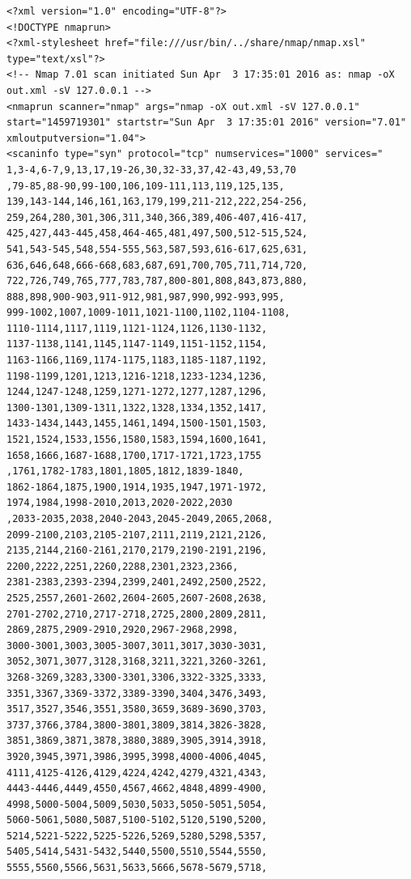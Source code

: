 \documentclass[12pt,a4paper]{report}
\begin{document}
\begin{lstlisting}[breaklines]
<?xml version="1.0" encoding="UTF-8"?>
<!DOCTYPE nmaprun>
<?xml-stylesheet href="file:///usr/bin/../share/nmap/nmap.xsl" type="text/xsl"?>
<!-- Nmap 7.01 scan initiated Sun Apr  3 17:35:01 2016 as: nmap -oX out.xml -sV 127.0.0.1 -->
<nmaprun scanner="nmap" args="nmap -oX out.xml -sV 127.0.0.1" start="1459719301" startstr="Sun Apr  3 17:35:01 2016" version="7.01" xmloutputversion="1.04">
<scaninfo type="syn" protocol="tcp" numservices="1000" services="
1,3-4,6-7,9,13,17,19-26,30,32-33,37,42-43,49,53,70
,79-85,88-90,99-100,106,109-111,113,119,125,135,
139,143-144,146,161,163,179,199,211-212,222,254-256,
259,264,280,301,306,311,340,366,389,406-407,416-417,
425,427,443-445,458,464-465,481,497,500,512-515,524,
541,543-545,548,554-555,563,587,593,616-617,625,631,
636,646,648,666-668,683,687,691,700,705,711,714,720,
722,726,749,765,777,783,787,800-801,808,843,873,880,
888,898,900-903,911-912,981,987,990,992-993,995,
999-1002,1007,1009-1011,1021-1100,1102,1104-1108,
1110-1114,1117,1119,1121-1124,1126,1130-1132,
1137-1138,1141,1145,1147-1149,1151-1152,1154,
1163-1166,1169,1174-1175,1183,1185-1187,1192,
1198-1199,1201,1213,1216-1218,1233-1234,1236,
1244,1247-1248,1259,1271-1272,1277,1287,1296,
1300-1301,1309-1311,1322,1328,1334,1352,1417,
1433-1434,1443,1455,1461,1494,1500-1501,1503,
1521,1524,1533,1556,1580,1583,1594,1600,1641,
1658,1666,1687-1688,1700,1717-1721,1723,1755
,1761,1782-1783,1801,1805,1812,1839-1840,
1862-1864,1875,1900,1914,1935,1947,1971-1972,
1974,1984,1998-2010,2013,2020-2022,2030
,2033-2035,2038,2040-2043,2045-2049,2065,2068,
2099-2100,2103,2105-2107,2111,2119,2121,2126,
2135,2144,2160-2161,2170,2179,2190-2191,2196,
2200,2222,2251,2260,2288,2301,2323,2366,
2381-2383,2393-2394,2399,2401,2492,2500,2522,
2525,2557,2601-2602,2604-2605,2607-2608,2638,
2701-2702,2710,2717-2718,2725,2800,2809,2811,
2869,2875,2909-2910,2920,2967-2968,2998,
3000-3001,3003,3005-3007,3011,3017,3030-3031,
3052,3071,3077,3128,3168,3211,3221,3260-3261,
3268-3269,3283,3300-3301,3306,3322-3325,3333,
3351,3367,3369-3372,3389-3390,3404,3476,3493,
3517,3527,3546,3551,3580,3659,3689-3690,3703,
3737,3766,3784,3800-3801,3809,3814,3826-3828,
3851,3869,3871,3878,3880,3889,3905,3914,3918,
3920,3945,3971,3986,3995,3998,4000-4006,4045,
4111,4125-4126,4129,4224,4242,4279,4321,4343,
4443-4446,4449,4550,4567,4662,4848,4899-4900,
4998,5000-5004,5009,5030,5033,5050-5051,5054,
5060-5061,5080,5087,5100-5102,5120,5190,5200,
5214,5221-5222,5225-5226,5269,5280,5298,5357,
5405,5414,5431-5432,5440,5500,5510,5544,5550,
5555,5560,5566,5631,5633,5666,5678-5679,5718,

\end{lstlisting}
\end{document}
